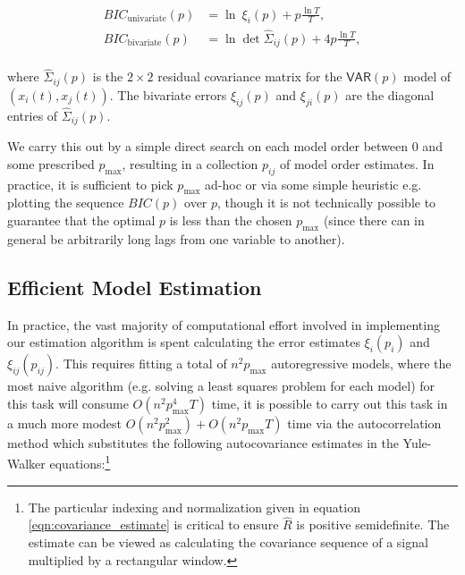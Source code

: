 \documentclass[12pt]{article}
\def\VAR{\mathsf{VAR}}  %
\begin{document}
\begin{equation}
  \label{eqn:bic}
  \begin{aligned}
    BIC_{\text{univariate}}(p) &= \ln\ \xi_i(p) + p\frac{\ln T}{T},\\
    BIC_{\text{bivariate}}(p) &= \ln \det \widehat{\Sigma}_{ij}(p) + 4p\frac{\ln T}{T},\\
  \end{aligned}
\end{equation}

where $\widehat{\Sigma}_{ij}(p)$ is the $2 \times 2$ residual
covariance matrix for the $\VAR(p)$ model of $(x_i(t), x_j(t))$.  The
bivariate errors $\xi_{ij}(p)$ and $\xi_{ji}(p)$ are the diagonal
entries of $\widehat{\Sigma}_{ij}(p)$.

We carry this out by a simple direct search on each model order
between $0$ and some prescribed $p_\text{max}$, resulting in a
collection $p_{ij}$ of model order estimates.  In practice, it is
sufficient to pick $p_\text{max}$ ad-hoc or via some simple heuristic
e.g. plotting the sequence $BIC(p)$ over $p$, though it is not
technically possible to guarantee that the optimal $p$ is less than
the chosen $p_\text{max}$ (since there can in general be arbitrarily
long lags from one variable to another).

\subsection{Efficient Model Estimation}
\label{sec:efficient_model_estimation}
In practice, the vast majority of computational effort involved in
implementing our estimation algorithm is spent calculating the error
estimates $\xi_i(p_i)$ and $\xi_{ij}(p_{ij})$.  This requires fitting a
total of $n^2p_{\text{max}}$ autoregressive models, where the most
naive algorithm (e.g. solving a least squares problem for each model)
for this task will consume $O(n^2p_{\text{max}}^4T)$ time, it is
possible to carry out this task in a much more modest
$O(n^2p_{\text{max}}^2 ) + O(n^2p_{\text{max}}T)$ time via the
autocorrelation method
\cite{hayes_statistical_digital_signal_processing} which substitutes
the following autocovariance estimates in the Yule-Walker
equations:\footnote{The particular indexing and normalization given in
  equation \ref{eqn:covariance_estimate} is critical to ensure
  $\widehat{R}$ is positive semidefinite.  The estimate can be viewed
  as calculating the covariance sequence of a signal multiplied by a
  rectangular window.}
\end{document}

